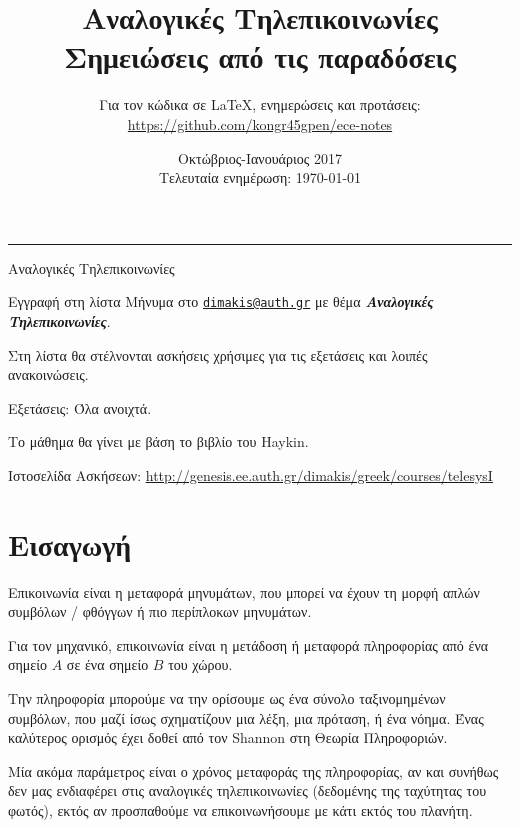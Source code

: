 \documentclass[11pt,a4paper,notitlepage,fleqn]{article}
\title{Αναλογικές Τηλεπικοινωνίες
	\\
	{ 
		\normalsize Σημειώσεις από τις παραδόσεις
	}}
\date{Οκτώβριος-Ιανουάριος 2017
	\\
	{ 
		\small Τελευταία ενημέρωση: \today
	}
}
\author{
	Για τον κώδικα σε \LaTeX, ενημερώσεις και προτάσεις:
	\\
	\url{https://github.com/kongr45gpen/ece-notes}}
\begin{document}
\maketitle

\hrule
\vspace{50pt}
	
Αναλογικές Τηλεπικοινωνίες

\begin{attnbox}{Εγγραφή στη λίστα}
	Μήνυμα στο \href{mailto:dimakis@auth.gr}{\texttt{dimakis@auth.gr}} με θέμα
	\textit{\textbf{Αναλογικές Τηλεπικοινωνίες}}.
	
	\tcblower
	
	Στη λίστα θα στέλνονται ασκήσεις χρήσιμες για τις εξετάσεις και λοιπές ανακοινώσεις.
\end{attnbox}

Εξετάσεις: Όλα ανοιχτά.

Το μάθημα θα γίνει με βάση το βιβλίο του Haykin.

Ιστοσελίδα Ασκήσεων:
\url{http://genesis.ee.auth.gr/dimakis/greek/courses/telesysI}

\newpage

\tableofcontents

\newpage

\section{Εισαγωγή}
Επικοινωνία είναι η μεταφορά μηνυμάτων, που μπορεί να έχουν τη μορφή απλών συμβόλων / φθόγγων
ή πιο περίπλοκων μηνυμάτων.

Για τον μηχανικό, επικοινωνία είναι η μετάδοση ή μεταφορά πληροφορίας από ένα σημείο \( A \) σε ένα σημείο \( B \) του χώρου.

\begin{center}
\end{center}

Την πληροφορία μπορούμε να την ορίσουμε ως ένα σύνολο ταξινομημένων συμβόλων, που μαζί ίσως
σχηματίζουν μια λέξη, μια πρόταση, ή ένα νόημα. Ένας καλύτερος ορισμός έχει δοθεί από τον
Shannon στη Θεωρία Πληροφοριών.

Μία ακόμα παράμετρος είναι ο χρόνος μεταφοράς της πληροφορίας, αν και συνήθως δεν μας
ενδιαφέρει στις αναλογικές τηλεπικοινωνίες (δεδομένης της ταχύτητας του φωτός), εκτός
αν προσπαθούμε να επικοινωνήσουμε με κάτι εκτός του πλανήτη.
\end{document}
